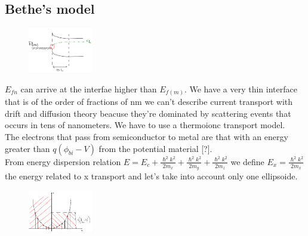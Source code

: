 \subsection{Bethe's model}

\begin{figure}
\includegraphics[width=0.25\textwidth]{msne.png}
\end{figure}

$E_{fn}$ can arrive at the interfae higher than $E_{f(m)}$. We have a very thin interface that is of the order of fractions of nm we can't describe current transport with drift and diffusion theory beacuse they're dominated by scattering events that occurs in tens of nanometers. We have to use a thermoionc transport model.\\
The electrons that pass from semiconductor to metal are that with an energy greater than $q(\phi_{bi}-V)$ from the potential material [?].\\
From energy dispersion relation $E=E_c+\frac{\hslash^2k^2}{2m_x}+\frac{\hslash^2k^2}{2m_y}+\frac{\hslash^2k^2}{2m_z}$ we define $E_x=\frac{\hslash^2k^2}{2m_x}$ the energy related to x transport and let's take into account only one ellipsoide.\\

\begin{figure}
\includegraphics[width=0.25\textwidth]{bethe.png}
\end{figure}

